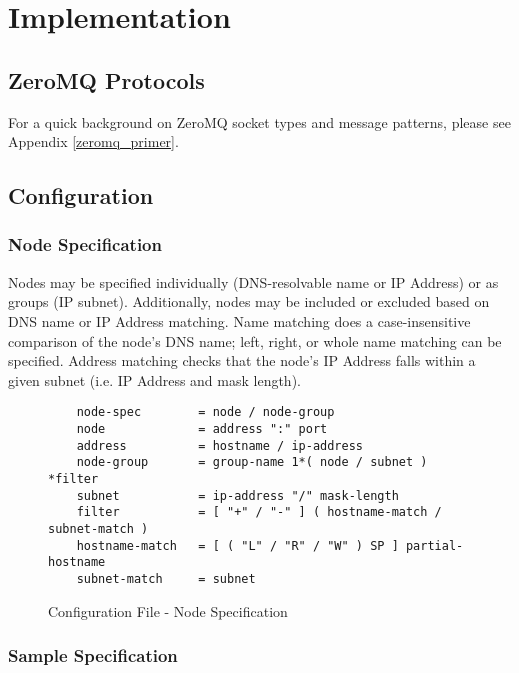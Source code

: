 \chapter{Implementation}
\label{implementation}

\section{ZeroMQ Protocols}

For a quick background on ZeroMQ socket types and message patterns, please see Appendix \ref{zeromq_primer}.






\section{Configuration}

\subsection{Node Specification}

Nodes may be specified individually (DNS-resolvable name or IP Address) or as groups (IP subnet). Additionally, nodes
may be included or excluded based on DNS name or IP Address matching. Name matching does a case-insensitive comparison
of the node's DNS name; left, right, or whole name matching can be specified. Address matching checks that the node's IP
Address falls within a given subnet (i.e. IP Address and mask length).

\begin{figure}[ht]
    \begin{lstlisting}
    node-spec        = node / node-group
    node             = address ":" port
    address          = hostname / ip-address
    node-group       = group-name 1*( node / subnet ) *filter
    subnet           = ip-address "/" mask-length
    filter           = [ "+" / "-" ] ( hostname-match / subnet-match )
    hostname-match   = [ ( "L" / "R" / "W" ) SP ] partial-hostname
    subnet-match     = subnet
    \end{lstlisting}
    \caption{Configuration File - Node Specification}
    \label{fig:config_file_node}
\end{figure}

\subsection{Sample Specification}

